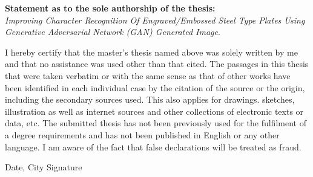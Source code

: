 \documentclass[a4paper,12pt]{report}
\begin{document}


\setcounter{secnumdepth}{1}


\noindent \textbf{Statement as to the sole authorship of the thesis:}
\vspace{0.4cm}
\\\textit{Improving Character Recognition Of Engraved/Embossed Steel Type Plates Using Generative Adversarial Network (GAN) Generated Image}. \\
\vspace{1cm}

	
	
	
	I hereby certify that the master's thesis named above was solely written by me and that no assistance was used other than that cited. The passages in this thesis that were taken verbatim or with the same sense as that of other works have been identified in each individual case by the citation of the source or the origin, including the secondary sources used. This also applies for drawings. sketches, illustration as well as internet sources and other collections of electronic texts or data, etc. The submitted thesis has not been previously used for the fulfilment of a degree requirements and has not been published in English or any other language. I am aware of the fact that false declarations will be treated as fraud.
\vspace{7cm}

Date, City Signature

\thispagestyle{empty}
\setcounter{tocdepth}{2}
\setcounter{secnumdepth}{3}
\newpage

\newpage
\tableofcontents
\newpage
\listoffigures
\listoftables
\newpage
\printglossary[type=abbreviations,,title={List of Abbreviations}]
\clearpage
{}

\newpage

\newpage

\newpage

\newpage

\newpage

\newpage
{}
%

 
\end{document}
